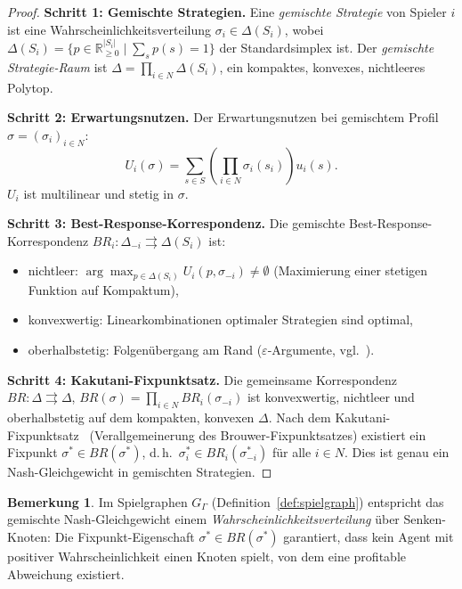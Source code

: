 ﻿\documentclass[a4paper,12pt]{article}
\theoremstyle{definition}
\newtheorem{bemerkung}{Bemerkung}
\begin{document}
\begin{proof}
\textbf{Schritt 1: Gemischte Strategien.}
Eine \emph{gemischte Strategie} von Spieler $i$ ist eine
Wahrscheinlichkeitsverteilung $\sigma_i \in \Delta(S_i)$, wobei
$\Delta(S_i) = \{p \in \mathbb{R}^{|S_i|}_{\geq 0} \mid \sum_s p(s) = 1\}$
der Standardsimplex ist.
Der \emph{gemischte Strategie-Raum} ist
$\Delta = \prod_{i \in N} \Delta(S_i)$, ein kompaktes, konvexes, nichtleeres
Polytop.

\textbf{Schritt 2: Erwartungsnutzen.}
Der Erwartungsnutzen bei gemischtem Profil $\sigma = (\sigma_i)_{i \in N}$:
\[
U_i(\sigma) = \sum_{s \in S} \left(\prod_{i \in N} \sigma_i(s_i)\right)
u_i(s).
\]
$U_i$ ist multilinear und stetig in $\sigma$.

\textbf{Schritt 3: Best-Response-Korrespondenz.}
Die gemischte Best-Response-Korrespondenz
$BR_i: \Delta_{-i} \rightrightarrows \Delta(S_i)$ ist:
\begin{itemize}
    \item nichtleer: $\arg\max_{p \in \Delta(S_i)} U_i(p, \sigma_{-i})
          \neq \emptyset$ (Maximierung einer stetigen Funktion auf Kompaktum),
    \item konvexwertig: Linearkombinationen optimaler Strategien sind optimal,
    \item oberhalbstetig: Folgen\"ubergang am Rand ($\varepsilon$-Argumente, vgl.~\cite{fudenberg1991}).
\end{itemize}

\textbf{Schritt 4: Kakutani-Fixpunktsatz.}
Die gemeinsame Korrespondenz
$BR: \Delta \rightrightarrows \Delta$,
$BR(\sigma) = \prod_{i \in N} BR_i(\sigma_{-i})$
ist konvexwertig, nichtleer und oberhalbstetig auf dem kompakten, konvexen
$\Delta$. Nach dem Kakutani-Fixpunktsatz~\cite{kakutani1941} (Verallgemeinerung
des Brouwer-Fixpunktsatzes) existiert ein Fixpunkt $\sigma^* \in BR(\sigma^*)$,
d.\,h.\ $\sigma_i^* \in BR_i(\sigma_{-i}^*)$ f\"ur alle $i \in N$.
Dies ist genau ein Nash-Gleichgewicht in gemischten Strategien.
\end{proof}

\begin{bemerkung}
Im Spielgraphen $G_\Gamma$ (Definition~\ref{def:spielgraph}) entspricht das
gemischte Nash-Gleichgewicht einem \emph{Wahrscheinlichkeitsverteilung} \"uber
Senken-Knoten: Die Fixpunkt-Eigenschaft $\sigma^* \in BR(\sigma^*)$ garantiert,
dass kein Agent mit positiver Wahrscheinlichkeit einen Knoten spielt, von dem
eine profitable Abweichung existiert.
\end{bemerkung}
\end{document}
